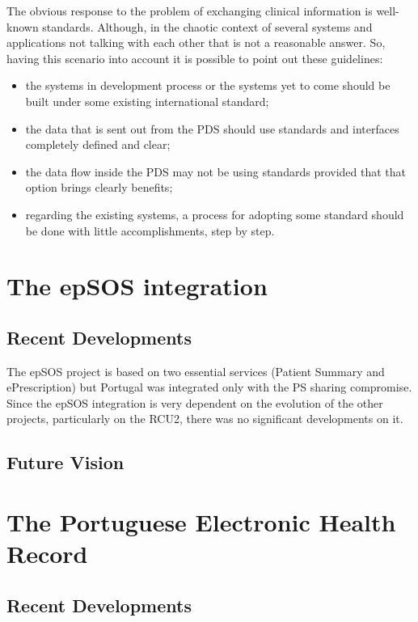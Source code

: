 The obvious response to the problem of exchanging clinical information is well-known standards. Although, in the chaotic context of several systems and applications not talking with each other that is not a reasonable answer. So, having this scenario into account it is possible to point out these guidelines:
\begin{itemize}
\item the systems in development process or the systems yet to come should be built under some existing international standard;
\item the data that is sent out from the PDS should use standards and interfaces completely defined and clear;
\item the data flow inside the PDS may not be using standards provided that that option brings clearly benefits;
\item regarding the existing systems, a process for adopting some standard should be done with little accomplishments, step by step.
\end{itemize}



\section{The epSOS integration}

\subsection{Recent Developments}

The epSOS project is based on two essential services (Patient Summary and ePrescription) but Portugal was integrated only with the PS sharing compromise. Since the epSOS integration is very dependent on the evolution of the other projects, particularly on the RCU2, there was no significant developments on it.

\subsection{Future Vision}






\section{The Portuguese Electronic Health Record}

\subsection{Recent Developments}


